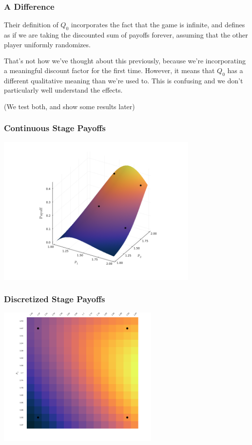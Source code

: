 \documentclass{beamer}
\begin{document}
\begin{frame}\frametitle{A Difference}
	Their definition of $Q_0$ incorporates the fact that the game is infinite, and defines as if we are taking the discounted sum of payoffs forever, assuming that the other player uniformly randomizes.
	
	That's not how we've thought about this previously, because we're incorporating a meaningful discount factor for the first time. However, it means that $Q_0$ has a different qualitative meaning than we're used to. This is confusing and we don't particularly well understand the effects.
	
	(We test both, and show some results later)
\end{frame}
\begin{frame}\frametitle{Continuous Stage Payoffs}
\centering
	\includegraphics[width=10cm]{cont_plot.png}
\end{frame}
\begin{frame}\frametitle{Discretized Stage Payoffs}
\centering
	\includegraphics[width=8cm]{heatmap_plot.png}
\end{frame}
\end{document}
